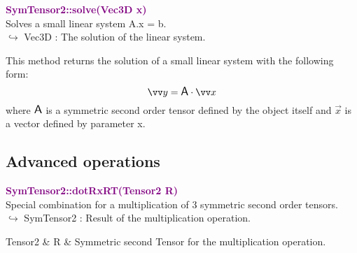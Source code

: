 \textcolor{purple}{\textbf{SymTensor2::solve(Vec3D x)}}\label{SymTensor2::solve(Vec3D x)}\\
Solves a small linear system A.x = b.\\ \hspace*{10mm}$\hookrightarrow$ Vec3D : The solution of the linear system.

This method returns the solution of a small linear system with the following form:
\begin{equation*}
\overrightarrow{y} = \A \cdot \overrightarrow{x}
\end{equation*}
where $\mbox{\large\ensuremath{\mathsf{A}}}$ is a symmetric second order tensor defined by the object itself and $\overrightarrow{x}$ is a vector defined by parameter x.

\subsection{Advanced operations}

\textcolor{purple}{\textbf{SymTensor2::dotRxRT(Tensor2 R)}}\label{SymTensor2::dotRxRT(Tensor2 R)}\\
Special combination for a multiplication of 3 symmetric second order tensors.\\ \hspace*{10mm}$\hookrightarrow$ SymTensor2 : Result of the multiplication operation.

\begin{tcolorbox}[width=\textwidth,myArgs,tabularx={ll|R}]
Tensor2 & R & Symmetric second Tensor for the multiplication operation.
\end{tcolorbox}

